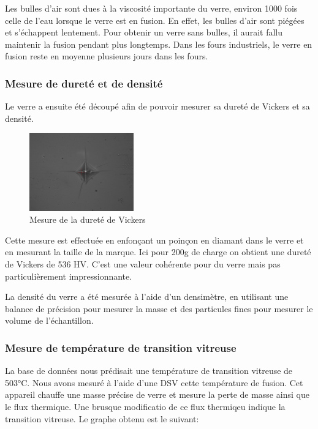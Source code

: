 \documentclass{article}
\begin{document}
Les bulles d'air sont dues à la viscosité importante du verre, environ 1000 fois celle de l'eau lorsque le verre est en fusion. En effet, les bulles d'air sont piégées et s'échappent lentement. Pour obtenir un verre sans bulles, il aurait fallu maintenir la fusion pendant plus longtemps. Dans les fours industriels, le verre en fusion reste en moyenne plusieurs jours dans les fours.

\subsubsection{Mesure de dureté et de densité}

Le verre a ensuite été découpé afin de pouvoir mesurer sa dureté de Vickers et sa densité. 

\begin{figure}[ht]
    \centering
    \includegraphics[width=0.4\textwidth]{photos/dureté.jpg}
    \caption{Mesure de la dureté de Vickers}
\end{figure}

Cette mesure est effectuée en enfonçant un poinçon en diamant dans le verre et en mesurant la taille de la marque. Ici pour 200g de charge on obtient une dureté de Vickers de 536 HV. C'est une valeur cohérente pour du verre mais pas particulièrement impressionnante.

La densité du verre a été mesurée à l'aide d'un densimètre, en utilisant une balance de précision pour mesurer la masse et des particules fines pour mesurer le volume de l'échantillon. 

\subsubsection{Mesure de température de transition vitreuse}

La base de données nous prédisait une température de transition vitreuse de 503°C. Nous avons mesuré à l'aide d'une DSV cette température de fusion. Cet appareil chauffe une masse précise de verre et mesure la perte de masse ainsi que le flux thermique. Une brusque modificatio de ce flux thermiqeu indique la transition vitreuse.
Le graphe obtenu est le suivant:
\end{document}
